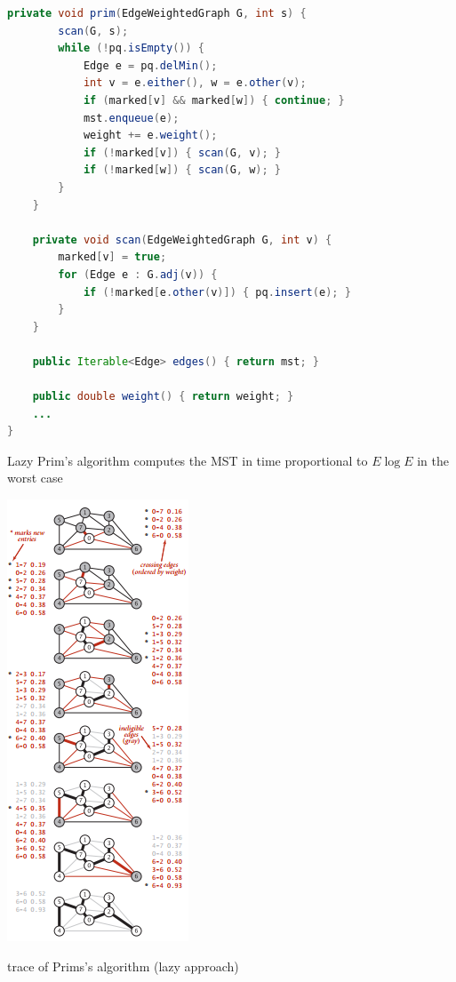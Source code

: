 \documentclass[8pt,a4paper,compress]{beamer}
\begin{document}
\begin{frame}[fragile]
\begin{minipage}{240pt}
\begin{lstlisting}[language=Java]
   private void prim(EdgeWeightedGraph G, int s) {
        scan(G, s);
        while (!pq.isEmpty()) { 
            Edge e = pq.delMin(); 
            int v = e.either(), w = e.other(v);  
            if (marked[v] && marked[w]) { continue; }  
            mst.enqueue(e); 
            weight += e.weight();
            if (!marked[v]) { scan(G, v); }  
            if (!marked[w]) { scan(G, w); } 
        }
    }

    private void scan(EdgeWeightedGraph G, int v) {
        marked[v] = true;
        for (Edge e : G.adj(v)) {
            if (!marked[e.other(v)]) { pq.insert(e); }
        }
    }
    
    public Iterable<Edge> edges() { return mst; }

    public double weight() { return weight; }
    ...
}
\end{lstlisting}

Lazy Prim's algorithm computes the MST in time proportional
to $E \log E$ in the worst case
\end{minipage}%
\begin{minipage}{90pt}
\begin{center}
\includegraphics[scale=0.4]{./figures/mst5.png}

\smallskip

\tiny trace of Prims's algorithm (lazy approach)
\end{center}
\end{minipage}
\end{frame}
\end{document}
